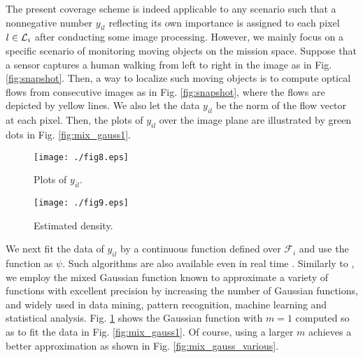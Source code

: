 \documentclass[conference,letterpaper]{ieeeconf}
\newcommand{\F}{{\mathcal F}}
\renewcommand{\L}{{\cal L}}
\begin{document}
The present coverage scheme is indeed applicable to any scenario
such that a nonnegative number $y_{il}$ reflecting 
its own importance is assigned to each pixel $l \in \L_i$
after conducting some image processing.
However, we mainly focus on a specific scenario of
monitoring moving objects on the mission space.
Suppose that a sensor captures a human walking from 
left to right in the image as in Fig. \ref{fig:snapshot}.
Then, a way to localize such moving objects is to
compute optical flows from consecutive images as in Fig. \ref{fig:snapshot},
where the flows are depicted by yellow lines.
We also let the data $y_{il}$ be the norm of the flow vector
at each pixel.
Then, the plots of $y_{il}$ over the image plane 
are illustrated by green dots in  Fig. \ref{fig:mix_gauss1}.

\begin{figure}
\begin{center}
\begin{minipage}{4.2cm}
{\texttt{[image: ./fig8.eps]}}
\caption{Plots of $y_{il}$.}
\label{fig:mix_gauss1}
\end{minipage}
\begin{minipage}{4.2cm}
{\texttt{[image: ./fig9.eps]}}
\caption{Estimated density.}
\label{fig:mix_gauss2}
\end{minipage}
\end{center}
\end{figure}







We next fit the data of $y_{il}$ by a continuous function
defined over $\F_i$ and use the function as $\psi$.
Such algorithms are also available
even in real time \cite{MATLAB2}.
Similarly to \cite{IJRR}, we employ the mixed Gaussian function
known to approximate a variety of functions with excellent precision
by increasing the number of Gaussian functions,
and widely used in data mining, pattern recognition,
machine learning and statistical analysis.
Fig. \ref{fig:mix_gauss2} shows the Gaussian function with $m=1$ computed so as to fit the data
in Fig. \ref{fig:mix_gauss1}.
Of course, using a larger $m$ achieves a better approximation
as shown in Fig. \ref{fig:mix_gauss_various}.
\end{document}

